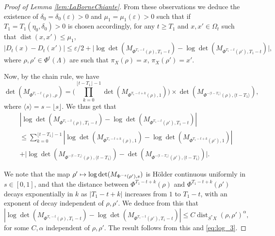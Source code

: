 \documentclass[10pt]{amsart}
\newcommand\mto{\mathchoice{\longmapsto}{\mapsto}{\mapsto}{\mapsto}}
\DeclareMathOperator{\dist}{dist}
\theoremstyle{plain}
\theoremstyle{definition}
\begin{document}
\begin{proof}[Proof of Lemma \ref{lem:LaBorneChiante}]
From these observations we deduce the existence of $\delta_0=\delta_0(\varepsilon)>0$ and $\mu_1=\mu_1(\varepsilon)>0$ such that if $T_1=T_1(\eta_0,\delta_0)>0$ is chosen accordingly, for any $t\geq T_1$ and $x,x'\in\Omega_t$ such that $\dist(x,x')\leq\mu_1$,\vspace*{-3pt}
\begin{equation}\label{eq:log_3}
|D_t(x)-D_t(x')|\leq \varepsilon/2+\bigl|\log \det(M_{\Phi^{T_1-t}(\rho), T_1-t}) - \log \det(M_{\Phi^{T_1-t}(\rho'), T_1-t}) \bigr|,
\end{equation}
where $\rho,\rho'\in \Phi^t(\Lambda)$ are such that $\pi_X(\rho)= x$, $\pi_X(\rho')=x'$.

Now, by the chain rule, we have\vspace*{-1pt}
\[
\det(M_{\Phi^{T_1-t}(\rho), \rho}) = \biggl(\prod_{k=0}^{\lfloor t- T_1 \rfloor- 1} \det(M_{\Phi^{T_1-t+k}(\rho), 1}) \biggr) \times \det(M_{\Phi^{ - \langle t- T_1\rangle }(\rho), \langle t- T_1\rangle }),
\]
where $\langle s\rangle = s- \lfloor s \rfloor$. We thus get that\vspace*{-3pt}
\begin{multline*}
\left|\log \det(M_{\Phi^{T_1-t}(\rho), T_1-t}) - \log \det(M_{\Phi^{T_1-t}(\rho'), T_1-t}) \right| \\
\leq \sum_{k=0}^{\lfloor t- T_1 \rfloor- 1} \left|\log \det(M_{\Phi^{T_1-t+k}(\rho), 1}) - \log \det(M_{\Phi^{T_1-t+k}(\rho'), 1})\right| \\[-5pt]
+ \bigl|\log \det(M_{\Phi^{ - \langle t- T_1\rangle }(\rho), \langle t- T_1\rangle }) - \det(M_{\Phi^{ - \langle t- T_1\rangle }(\rho'), \langle t- T_1\rangle })\bigr|.
\end{multline*}

We note that the map $\rho'\mto \log \det(M_{\Phi^{ - s }(\rho'), s })$ is Hölder continuous uniformly in $s\in[0,1]$, and that the distance between $\Phi^{T_1-t+k}(\rho)$ and $\Phi^{T_1-t+k}(\rho')$ decays exponentially in $k$ as $|T_1-t+k|$ increases from $1$ to $T_1-t$, with an exponent of decay independent of $\rho, \rho'$. We deduce from this that
\[
\left|\log \det(M_{\Phi^{T_1-t}(\rho), T_1-t}) - \log \det(M_{\Phi^{T_1-t}(\rho'), T_1-t}) \right| \leq C \dist_{S^*X}(\rho, \rho')^\alpha,
\]
for some $C,\alpha$ independent of $\rho, \rho'$. The result follows from this and \eqref{eq:log_3}.
\end{proof}
\end{document}
